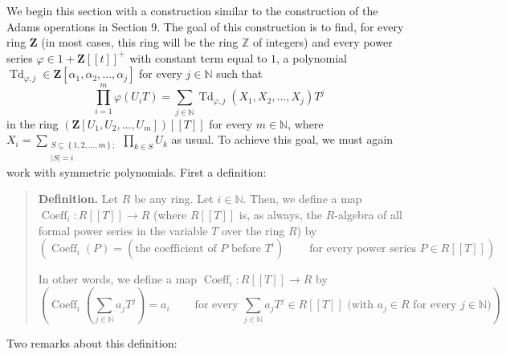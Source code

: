 \documentclass[numbers=enddot,12pt,final,onecolumn,notitlepage]{scrartcl}%
\begin{document}
We begin this section with a construction similar to the construction of the
Adams operations in Section 9. The goal of this construction is to find, for
every ring $\mathbf{Z}$ (in most cases, this ring will be the ring
$\mathbb{Z}$ of integers) and every power series $\varphi\in1+\mathbf{Z}%
\left[  \left[  t\right]  \right]  ^{+}$ with constant term equal to $1$, a
polynomial $\operatorname*{Td}_{\varphi,j}\in\mathbf{Z}\left[  \alpha
_{1},\alpha_{2},...,\alpha_{j}\right]  $ for every $j\in\mathbb{N}$ such that
\[
\prod\limits_{i=1}^{m}\varphi\left(  U_{i}T\right)  =\sum_{j\in\mathbb{N}%
}\operatorname*{Td}\nolimits_{\varphi,j}\left(  X_{1},X_{2},...,X_{j}\right)
T^{j}%
\]
in the ring $\left(  \mathbf{Z}\left[  U_{1},U_{2},...,U_{m}\right]  \right)
\left[  \left[  T\right]  \right]  $ for every $m\in\mathbb{N}$, where
$X_{i}=\sum\limits_{\substack{S\subseteq\left\{  1,2,...,m\right\}
;\\\left\vert S\right\vert =i}}\prod\limits_{k\in S}U_{k}$ as usual. To
achieve this goal, we must again work with symmetric polynomials. First a definition:

\begin{quote}
\textbf{Definition.} Let $R$ be any ring. Let $i\in\mathbb{N}$. Then, we
define a map $\operatorname*{Coeff}\nolimits_{i}:R\left[  \left[  T\right]
\right]  \rightarrow R$ (where $R\left[  \left[  T\right]  \right]  $ is, as
always, the $R$-algebra of all formal power series in the variable $T$ over
the ring $R$) by%
\[
\left(  \operatorname*{Coeff}\nolimits_{i}\left(  P\right)  =\left(  \text{the
coefficient of }P\text{ before }T^{i}\right)  \ \ \ \ \ \ \ \ \ \ \text{for
every power series }P\in R\left[  \left[  T\right]  \right]  \right)  .
\]


In other words, we define a map $\operatorname*{Coeff}\nolimits_{i}:R\left[
\left[  T\right]  \right]  \rightarrow R$ by%
\[
\left(  \operatorname*{Coeff}\nolimits_{i}\left(  \sum\limits_{j\in\mathbb{N}%
}a_{j}T^{j}\right)  =a_{i}\ \ \ \ \ \ \ \ \ \ \text{for every }\sum
\limits_{j\in\mathbb{N}}a_{j}T^{j}\in R\left[  \left[  T\right]  \right]
\text{ (with }a_{j}\in R\text{ for every }j\in\mathbb{N}\text{)}\right)  .
\]



\end{quote}

Two remarks about this definition:
\end{document}

